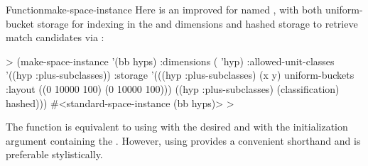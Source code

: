 \documentclass[10pt,twoside,english,pdftex]{article}
\begin{document}
\begin{functiondoc}{Function}{make-space-instance}
Here is an improved  for 
 named , with both uniform-bucket storage for
indexing in the  and  dimensions and hashed storage to
retrieve match candidates via 
:
%
\W\supp
\begin{example}
  > (make-space-instance '(bb hyps)
       :dimensions ( 'hyp)
       :allowed-unit-classes '((hyp :plus-subclasses))
       :storage '(((hyp :plus-subclasses) (x y) 
                   uniform-buckets :layout ((0 10000 100)
                                            (0 10000 100)))
                  ((hyp :plus-subclasses) (classification) 
                   hashed)))
  #<standard-space-instance (bb hyps)>
  >
\end{example}

\fnnote The  function is equivalent to
using  with the desired
 and with the initialization argument
 containing the .
However, using  provides a convenient
shorthand and is preferable stylistically.

\end{functiondoc}

\end{document}
